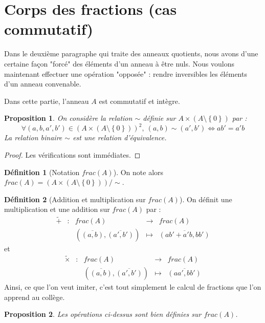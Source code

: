 \documentclass[french]{book}
\theoremstyle{plain}
\newtheorem{prop}{Proposition}[chapter]
\theoremstyle{definition}
\newtheorem{dfn}{Définition}[chapter]
\theoremstyle{remark}
\begin{document}
\section{Corps des fractions (cas commutatif)}
Dans le deuxième paragraphe qui traite des anneaux quotients, nous avons d'une certaine façon "forcé" des éléments d'un anneau à être nuls. Nous voulons maintenant effectuer une opération "opposée" : rendre inversibles les éléments d'un anneau convenable. \\ \par Dans cette partie, l'anneau $A$ est commutatif et intègre. 
\begin{prop}
	On considère la relation $\sim$ définie sur $A\times(A\setminus\left\{0\right\})$ par : $$\forall(a,b,a',b')\in\left(A\times(A\setminus\left\{0\right\})\right)^2,\ (a,b)\sim(a',b') \iff ab'=a'b$$ La relation binaire $\sim$ est une relation d'équivalence.
\end{prop}
\begin{proof}
	Les vérifications sont immédiates. 
\end{proof}
\begin{dfn}[Notation $frac(A)$]
	On note alors $frac(A)=(A\times(A\setminus\left\{0\right\}))/\sim$.
\end{dfn}
\begin{dfn}[Addition et multiplication sur $frac(A)$]
	On définit une multiplication et une addition sur $frac(A)$ par : $$\begin{array}{ccccc}\tilde{+}&:&frac(A)&\rightarrow&frac(A)\\&&\left(\overline{(a,b)},\overline{(a',b')}\right)&\mapsto&\overline{(ab'+a'b,bb')}\end{array}$$ et $$\begin{array}{ccccc}\tilde{\times}&:&frac(A)&\rightarrow&frac(A)\\&&\left(\overline{(a,b)},\overline{(a',b')}\right)&\mapsto&\overline{(aa',bb')}\end{array}$$ Ainsi, ce que l'on veut imiter, c'est tout simplement le calcul de fractions que l'on apprend au collège.
\end{dfn}
\begin{prop}
	Les opérations ci-dessus sont bien définies sur $frac(A)$.
\end{prop}
\end{document}
